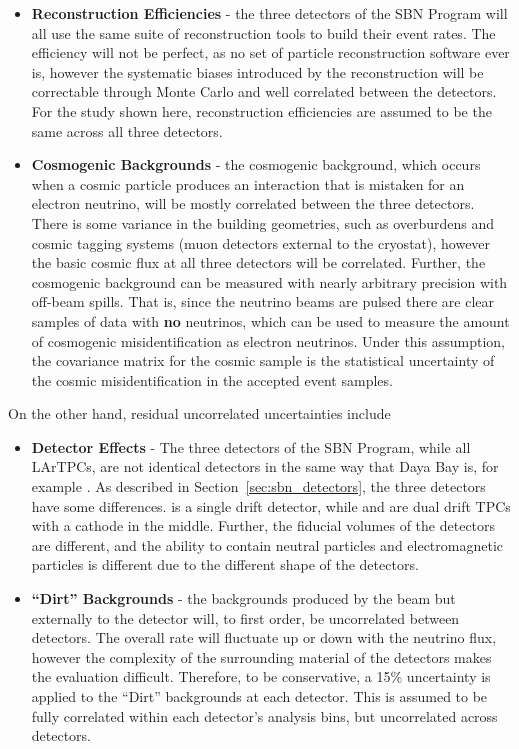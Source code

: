 \begin{itemize}
  \item {\bf Reconstruction Efficiencies} - the three detectors of the SBN Program will all use the same suite of reconstruction tools to build their event rates.  The efficiency will not be perfect, as no set of particle reconstruction software ever is, however the systematic biases introduced by the reconstruction will be correctable through Monte Carlo and well correlated between the detectors.  For the study shown here, reconstruction efficiencies are assumed to be the same across all three detectors.
  \item{\bf Cosmogenic Backgrounds} - the cosmogenic background, which occurs when a cosmic particle produces an interaction that is mistaken for an electron neutrino, will be mostly correlated between the three detectors.  There is some variance in the building geometries, such as overburdens and cosmic tagging systems (muon detectors external to the cryostat), however the basic cosmic flux at all three detectors will be correlated.  Further, the cosmogenic background can be measured with nearly arbitrary precision with off-beam spills.  That is, since the neutrino beams are pulsed there are clear samples of data with {\bf no} neutrinos, which can be used to measure the amount of cosmogenic misidentification as electron neutrinos.  Under this assumption, the covariance matrix for the cosmic sample is the statistical uncertainty of the cosmic misidentification in the accepted event samples.

\end{itemize}

On the other hand, residual uncorrelated uncertainties include

\begin{itemize}
  \item {\bf Detector Effects} - The three detectors of the SBN Program, while all LArTPCs, are not identical detectors in the same way that Daya Bay is, for example \cite{An:2015qga}.  As described in Section~\ref{sec:sbn_detectors}, the three detectors have some differences.  \uboone is a single drift detector, while \icarus and \sbnd are dual drift TPCs with a cathode in the middle.  Further, the fiducial volumes of the detectors are different, and the ability to contain neutral particles and electromagnetic particles is different due to the different shape of the detectors.
  \item{\bf ``Dirt'' Backgrounds} - the backgrounds produced by the beam but externally to the detector will, to first order, be uncorrelated between detectors.  The overall rate will fluctuate up or down with the neutrino flux, however the complexity of the surrounding material of the detectors makes the evaluation difficult.  Therefore, to be conservative, a 15\% uncertainty is applied to the ``Dirt'' backgrounds at each detector.  This is assumed to be fully correlated within each detector's analysis bins, but uncorrelated across detectors.
\end{itemize}

